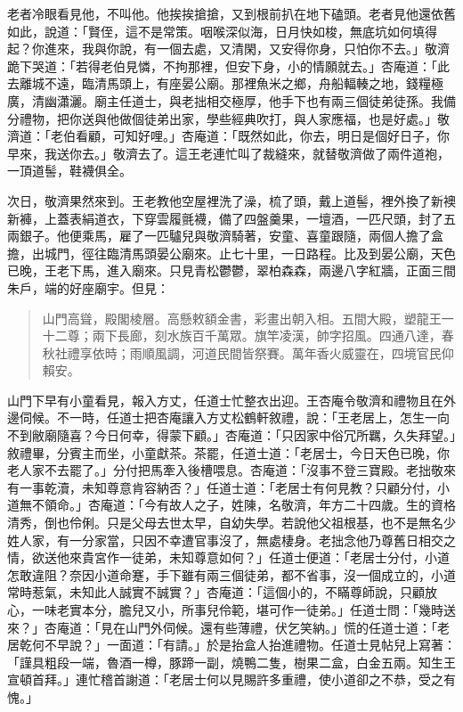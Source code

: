 老者冷眼看見他，不叫他。他挨挨搶搶，又到根前扒在地下磕頭。老者見他還依舊如此，說道：「賢侄，這不是常策。咽喉深似海，日月快如梭，無底坑如何填得起？你進來，我與你說，有一個去處，又清閑，又安得你身，只怕你不去。」敬濟跪下哭道：「若得老伯見憐，不拘那裡，但安下身，小的情願就去。」杏庵道：「此去離城不遠，臨清馬頭上，有座晏公廟。那裡魚米之鄉，舟船輻輳之地，錢糧極廣，清幽瀟灑。廟主任道士，與老拙相交極厚，他手下也有兩三個徒弟徒孫。我備分禮物，把你送與他做個徒弟出家，學些經典吹打，與人家應福，也是好處。」敬濟道：「老伯看顧，可知好哩。」杏庵道：「既然如此，你去，明日是個好日子，你早來，我送你去。」敬濟去了。這王老連忙叫了裁縫來，就替敬濟做了兩件道袍，一頂道髻，鞋襪俱全。

次日，敬濟果然來到。王老教他空屋裡洗了澡，梳了頭，戴上道髻，裡外換了新襖新褲，上蓋表絹道衣，下穿雲履氈襪，備了四盤羹果，一壇酒，一匹尺頭，封了五兩銀子。他便乘馬，雇了一匹驢兒與敬濟騎著，安童、喜童跟隨，兩個人擔了盒擔，出城門，徑往臨清馬頭晏公廟來。止七十里，一日路程。比及到晏公廟，天色已晚，王老下馬，進入廟來。只見青松鬱鬱，翠柏森森，兩邊八字紅牆，正面三間朱戶，端的好座廟宇。但見：
\begin{quote}
山門高聳，殿閣棱層。高懸敕額金書，彩畫出朝入相。五間大殿，塑龍王一十二尊；兩下長廊，刻水族百千萬眾。旗竿凌漢，帥字招風。四通八達，春秋社禮享依時；雨順風調，河道民間皆祭賽。萬年香火威靈在，四境官民仰賴安。
\end{quote}

山門下早有小童看見，報入方丈，任道士忙整衣出迎。王杏庵令敬濟和禮物且在外邊伺候。不一時，任道士把杏庵讓入方丈松鶴軒敘禮，說：「王老居上，怎生一向不到敝廟隨喜？今日何幸，得蒙下顧。」杏庵道：「只因家中俗冗所羈，久失拜望。」敘禮畢，分賓主而坐，小童獻茶。茶罷，任道士道：「老居士，今日天色已晚，你老人家不去罷了。」分付把馬牽入後槽喂息。杏庵道：「沒事不登三寶殿。老拙敬來有一事乾瀆，未知尊意肯容納否？」任道士道：「老居士有何見教？只顧分付，小道無不領命。」杏庵道：「今有故人之子，姓陳，名敬濟，年方二十四歲。生的資格清秀，倒也伶俐。只是父母去世太早，自幼失學。若說他父祖根基，也不是無名少姓人家，有一分家當，只因不幸遭官事沒了，無處棲身。老拙念他乃尊舊日相交之情，欲送他來貴宮作一徒弟，未知尊意如何？」任道士便道：「老居士分付，小道怎敢違阻？奈因小道命蹇，手下雖有兩三個徒弟，都不省事，沒一個成立的，小道常時惹氣，未知此人誠實不誠實？」杏庵道：「這個小的，不瞞尊師說，只顧放心，一味老實本分，膽兒又小，所事兒伶範，堪可作一徒弟。」任道士問：「幾時送來？」杏庵道：「見在山門外伺候。還有些薄禮，伏乞笑納。」慌的任道士道：「老居乾何不早說？」一面道：「有請。」於是抬盒人抬進禮物。任道士見帖兒上寫著：「謹具粗段一端，魯酒一樽，豚蹄一副，燒鴨二隻，樹果二盒，白金五兩。知生王宣頓首拜。」連忙稽首謝道：「老居士何以見賜許多重禮，使小道卻之不恭，受之有愧。」


